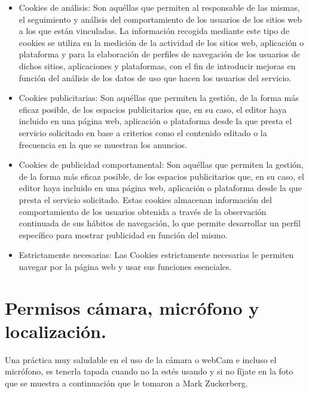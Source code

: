 \documentclass[
  spanish,
  a4paper,
  openany]{book}
\begin{document}
\begin{itemize}
\item
  Cookies de análisis: Son aquéllas que permiten al responsable de las mismas, el seguimiento y análisis del comportamiento de los usuarios de los sitios web a los que están vinculadas. La información recogida mediante este tipo de cookies se utiliza en la medición de la actividad de los sitios web, aplicación o plataforma y para la elaboración de perfiles de navegación de los usuarios de dichos sitios, aplicaciones y plataformas, con el fin de introducir mejoras en función del análisis de los datos de uso que hacen los usuarios del servicio.
\item
  Cookies publicitarias: Son aquéllas que permiten la gestión, de la forma más eficaz posible, de los espacios publicitarios que, en su caso, el editor haya incluido en una página web, aplicación o plataforma desde la que presta el servicio solicitado en base a criterios como el contenido editado o la frecuencia en la que se muestran los anuncios.
\item
  Cookies de publicidad comportamental: Son aquéllas que permiten la gestión, de la forma más eficaz posible, de los espacios publicitarios que, en su caso, el editor haya incluido en una página web, aplicación o plataforma desde la que presta el servicio solicitado. Estas cookies almacenan información del comportamiento de los usuarios obtenida a través de la observación continuada de sus hábitos de navegación, lo que permite desarrollar un perfil específico para mostrar publicidad en función del mismo.
\item
  Estrictamente necesarias: Las Cookies estrictamente necesarias le permiten navegar por la página web y usar sus funciones esenciales.
\end{itemize}

\hypertarget{permisos-cuxe1mara-micruxf3fono-y-localizaciuxf3n.}{%
\section{Permisos cámara, micrófono y localización.}\label{permisos-cuxe1mara-micruxf3fono-y-localizaciuxf3n.}}

Una práctica muy saludable en el uso de la cámara o webCam e incluso el micrófono, es tenerla tapada cuando no la estés usando y si no fíjate en la foto que se muestra a continuación que le tomaron a Mark Zuckerberg.
\end{document}

